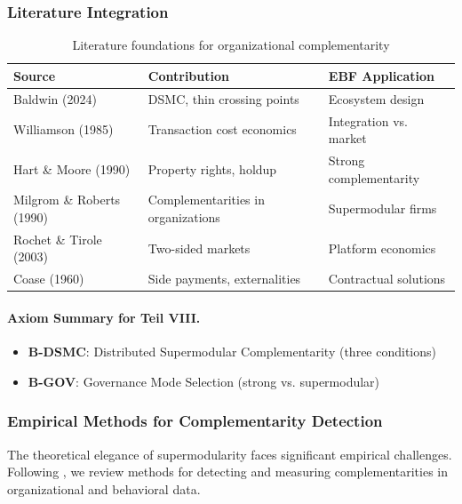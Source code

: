 \subsubsection{Literature Integration}

\begin{table}[h]
\centering
\small
\begin{tabular}{p{3.5cm}p{4cm}p{5cm}}
\toprule
\textbf{Source} & \textbf{Contribution} & \textbf{EBF Application} \\
\midrule
Baldwin (2024) & DSMC, thin crossing points & Ecosystem design \\
Williamson (1985) & Transaction cost economics & Integration vs. market \\
Hart \& Moore (1990) & Property rights, holdup & Strong complementarity \\
Milgrom \& Roberts (1990) & Complementarities in organizations & Supermodular firms \\
Rochet \& Tirole (2003) & Two-sided markets & Platform economics \\
Coase (1960) & Side payments, externalities & Contractual solutions \\
\bottomrule
\end{tabular}
\caption{Literature foundations for organizational complementarity}
\label{tab:org-lit}
\end{table}

\paragraph{Axiom Summary for Teil VIII.}

\begin{itemize}
    \item \textbf{B-DSMC}: Distributed Supermodular Complementarity (three conditions)
    \item \textbf{B-GOV}: Governance Mode Selection (strong vs. supermodular)
\end{itemize}




\subsubsection{Empirical Methods for Complementarity Detection}
\label{sec:empirical-methods}

The theoretical elegance of supermodularity faces significant empirical challenges. 
Following \citet{brynjolfsson2013complementarities}, we review methods for detecting 
and measuring complementarities in organizational and behavioral data.

